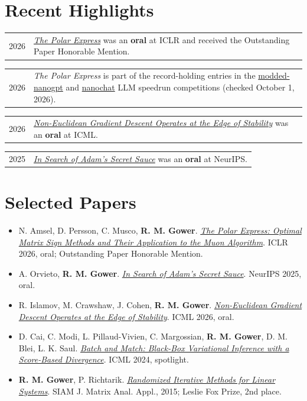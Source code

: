 \documentclass[10pt,letterpaper]{article}
\makeatletter
\newcommand{\simpleentry}[2]{%
  \par\noindent
  \begin{tabularx}{\textwidth}{@{}p{0.15\textwidth}X@{}}
    \textcolor{muted}{#1} & #2
  \end{tabularx}\par\vspace{0.18em}
}
\makeatother
\begin{document}
\section{Recent Highlights}
\simpleentry{2026}{\href{https://blog.iclr.cc/2026/04/23/announcing-the-iclr-2026-outstanding-papers/}{\emph{The Polar Express}} was an \textbf{oral} at ICLR and received the Outstanding Paper Honorable Mention.}
\simpleentry{2026}{\emph{The Polar Express} is part of the record-holding entries in the \href{https://github.com/KellerJordan/modded-nanogpt}{modded-nanogpt} and \href{https://github.com/karpathy/nanochat}{nanochat} LLM speedrun competitions (checked October 1, 2026).}
\simpleentry{2026}{\href{https://arxiv.org/abs/2603.05002}{\emph{Non-Euclidean Gradient Descent Operates at the Edge of Stability}} was an \textbf{oral} at ICML.}
\simpleentry{2025}{\href{https://neurips.cc/virtual/2025/loc/mexico-city/oral/130313}{\emph{In Search of Adam's Secret Sauce}} was an \textbf{oral} at NeurIPS.}

\section{Selected Papers}
\begin{itemize}
\item N. Amsel, D. Persson, C. Musco, \textbf{R. M. Gower}. \href{https://openreview.net/forum?id=yRtgZ1K8hO}{\emph{The Polar Express: Optimal Matrix Sign Methods and Their Application to the Muon Algorithm}}. ICLR 2026, oral; Outstanding Paper Honorable Mention.
\item A. Orvieto, \textbf{R. M. Gower}. \href{https://openreview.net/forum?id=CH72XyZs4y}{\emph{In Search of Adam's Secret Sauce}}. NeurIPS 2025, oral.
\item R. Islamov, M. Crawshaw, J. Cohen, \textbf{R. M. Gower}. \href{https://arxiv.org/abs/2603.05002}{\emph{Non-Euclidean Gradient Descent Operates at the Edge of Stability}}. ICML 2026, oral.
\item D. Cai, C. Modi, L. Pillaud-Vivien, C. Margossian, \textbf{R. M. Gower}, D. M. Blei, L. K. Saul. \href{https://proceedings.mlr.press/v235/cai24b.html}{\emph{Batch and Match: Black-Box Variational Inference with a Score-Based Divergence}}. ICML 2024, spotlight.
\item \textbf{R. M. Gower}, P. Richtarik. \href{https://doi.org/10.1137/15M1025487}{\emph{Randomized Iterative Methods for Linear Systems}}. SIAM J. Matrix Anal. Appl., 2015; Leslie Fox Prize, 2nd place.
\end{itemize}
\end{document}
